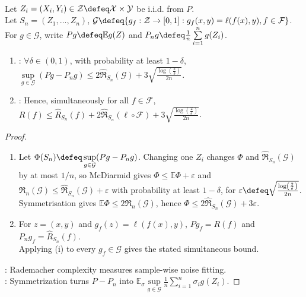 \begin{theorem} \label{thm:sl-rademacher-generalization-bound} \\
Let $Z_i=(X_i,Y_i)\in\mathcal{Z}\defeq\mathcal{X}\times\mathcal{Y}$ be i.i.d. from $P$.\\
Let $S_n=(Z_1,\ldots,Z_n)$, $\mathcal{G}\defeq\{g_f:\mathcal{Z}\to[0,1]:g_f(x,y)=\ell(f(x),y),f\in\mathcal{F}\}$.\\
For $g\in\mathcal{G}$, write $Pg\defeq\mathbb{E}g(Z)$ and $P_ng\defeq \frac{1}{n}\sum\limits_{i=1}^ng(Z_i)$.
\begin{enumerate}[label=(\roman*)]
\setlength{\itemsep}{0pt}
\item {}: $\forall \delta\in(0,1)$, with probability at least $1-\delta$, $\sup\limits_{g\in\mathcal{G}}(Pg-P_ng)\leq2\widehat{\mathfrak{R}}_{S_n}(\mathcal{G})+3\sqrt{\frac{\log\left(\frac{2}{\delta}\right)}{2n}}$.
\item {}: Hence, simultaneously for all $f\in\mathcal{F}$, $R(f)\leq\widehat{R}_{S_n}(f)+2\widehat{\mathfrak{R}}_{S_n}(\ell\circ\mathcal{F})+3\sqrt{\frac{\log\left(\frac{2}{\delta}\right)}{2n}}$.
\end{enumerate}
\end{theorem}

\begin{proof}
\begin{enumerate}[label=(\roman*)]
\setlength{\itemsep}{0pt}
\item Let $\Phi(S_n)\defeq\sup\limits_{g\in\mathcal{G}}(Pg-P_ng)$. Changing one $Z_i$ changes $\Phi$ and $\widehat{\mathfrak{R}}_{S_n}(\mathcal{G})$ by at most $1/n$, so McDiarmid gives $\Phi\leq\mathbb{E}\Phi+\varepsilon$ and $\mathfrak{R}_n(\mathcal{G})\leq\widehat{\mathfrak{R}}_{S_n}(\mathcal{G})+\varepsilon$ with probability at least $1-\delta$, for $\varepsilon\defeq\sqrt{\frac{\log\left(\frac{2}{\delta}\right)}{2n}}$.\\
Symmetrisation gives $\mathbb{E}\Phi\leq2\mathfrak{R}_n(\mathcal{G})$, hence $\Phi\leq2\widehat{\mathfrak{R}}_{S_n}(\mathcal{G})+3\varepsilon$.
\item For $z=(x,y)$ and $g_f(z)=\ell(f(x),y)$, $Pg_f=R(f)$ and $P_ng_f=\widehat{R}_{S_n}(f)$.\\
Applying (i) to every $g_f\in\mathcal{G}$ gives the stated simultaneous bound.
\end{enumerate}
: Rademacher complexity measures sample-wise noise fitting.\\
: Symmetrization turns $P-P_n$ into $\mathbb{E}_{\sigma}\sup\limits_{g\in\mathcal{G}}\frac{1}{n}\sum\limits_{i=1}^n\sigma_ig(Z_i)$.
\end{proof}

